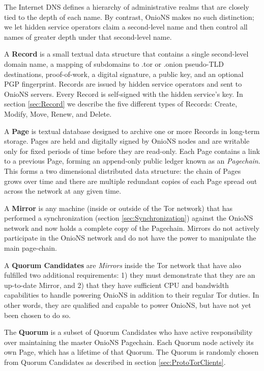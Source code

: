 	The Internet DNS defines a hierarchy of administrative realms that are closely tied to the depth of each name. By contrast, OnioNS makes no such distinction; we let hidden service operators claim a second-level name and then control all names of greater depth under that second-level name.

A \textbf{Record} is a small textual data structure that contains a single second-level domain name, a mapping of subdomains to .tor or .onion pseudo-TLD destinations, proof-of-work, a digital signature, a public key, and an optional PGP fingerprint. Records are issued by hidden service operators and sent to OnioNS servers. Every Record is self-signed with the hidden service's key. In section \ref{sec:Record} we describe the five different types of Records: Create, Modify, Move, Renew, and Delete.

A \textbf{Page} is textual database designed to archive one or more Records in long-term storage. Pages are held and digitally signed by OnioNS nodes and are writable only for fixed periods of time before they are read-only. Each Page contains a link to a previous Page, forming an append-only public ledger known as an \emph{Pagechain}. This forms a two dimensional distributed data structure: the chain of Pages grows over time and there are multiple redundant copies of each Page spread out across the network at any given time.
		
A \textbf{Mirror} is any machine (inside or outside of the Tor network) that has performed a synchronization (section \ref{sec:Synchronization}) against the OnioNS network and now holds a complete copy of the Pagechain. Mirrors do not actively participate in the OnioNS network and do not have the power to manipulate the main page-chain.

A \textbf{Quorum Candidates} are \emph{Mirrors} inside the Tor network that have also fulfilled two additional requirements: 1) they must demonstrate that they are an up-to-date Mirror, and 2) that they have sufficient CPU and bandwidth capabilities to handle powering OnioNS in addition to their regular Tor duties. In other words, they are qualified and capable to power OnioNS, but have not yet been chosen to do so.

The \textbf{Quorum} is a subset of Quorum Candidates who have active responsibility over maintaining the master OnioNS Pagechain. Each Quorum node actively its own Page, which has a lifetime of that Quorum. The Quorum is randomly chosen from Quorum Candidates as described in section \ref{sec:ProtoTorClients}.

